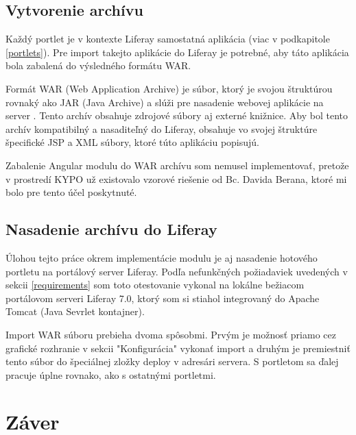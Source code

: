 \documentclass[
  digital, %
  twoside, %
  notable,   %
  nolof,   %
  nolot,   %
]{fithesis3}
\newcommand{\inquotes}[1]{{}"{}#1{}"{}}
\begin{document}
\section{Vytvorenie archívu}
Každý portlet je v kontexte Liferay samostatná aplikácia (viac v podkapitole \ref{portlets}). Pre import takejto aplikácie do Liferay je potrebné, aby táto aplikácia bola zabalená do výsledného formátu WAR.

Formát WAR (Web Application Archive) je súbor, ktorý je svojou štruktúrou rovnaký ako JAR (Java Archive) a slúži pre nasadenie webovej aplikácie na server \cite{javaWorld}. Tento archív obsahuje zdrojové súbory aj externé knižnice. Aby bol tento archív kompatibilný a nasaditeľný do Liferay, obsahuje vo svojej štruktúre špecifické JSP a XML súbory, ktoré túto aplikáciu popisujú.

Zabalenie Angular modulu do WAR archívu som nemusel implementovať, pretože v prostredí KYPO už existovalo vzorové riešenie od Bc. Davida Berana, ktoré mi bolo pre tento účel poskytnuté.

\section{Nasadenie archívu do Liferay}
Úlohou tejto práce okrem implementácie modulu je aj nasadenie hotového portletu na portálový server Liferay. Podľa nefunkčných požiadaviek uvedených v sekcii \ref{requirements} som toto otestovanie vykonal na lokálne bežiacom portálovom serveri Liferay 7.0, ktorý som si stiahol integrovaný do Apache Tomcat (Java Sevrlet kontajner).

Import WAR súboru prebieha dvoma spôsobmi. Prvým je možnosť priamo cez grafické rozhranie v sekcii \inquotes{Konfigurácia} vykonať import a druhým je premiestniť tento súbor do špeciálnej zložky deploy v adresári servera. S portletom sa ďalej pracuje úplne rovnako, ako s ostatnými portletmi.

\chapter{Záver}



\printbibliography[heading=bibintoc] %

  \makeatletter\thesis@blocks@clear\makeatother
  \printindex

\end{document}
